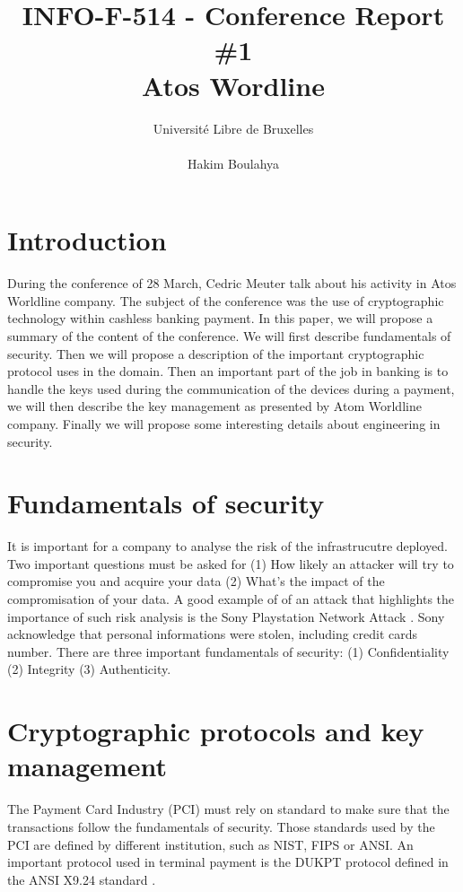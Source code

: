 \documentclass[10pt,a4paper]{article}
\title{INFO-F-514 - Conference Report \#1 \\
Atos Wordline}
\author{Université Libre de Bruxelles \\
\\ Hakim Boulahya}
\begin{document}
\maketitle

\newpage

\section{Introduction}

During the conference of 28 March, Cedric Meuter
talk about his activity in Atos Worldline company.
The subject of the conference was the use of
cryptographic technology within cashless banking payment.
In this paper, we will propose a summary of the content of the
conference. We will first describe fundamentals of security.
Then we will propose a description of the important
cryptographic protocol uses in the domain. Then an important
part of the job in banking is to handle the keys used
during the communication of the devices during a payment,
we will then describe the key management as presented
by Atom Worldline company.
Finally we will propose some interesting details about
engineering in security.


\section{Fundamentals of security}

It is important for a company to analyse the risk
of the infrastrucutre deployed. Two important questions must
be asked for (1) How likely an attacker will try to compromise
you and acquire your data (2) What's the impact of the compromisation
of your data. A good example of of an attack that highlights
the importance of such risk analysis is the Sony Playstation Network
Attack \cite{raiu_cyber-threat_2012}. Sony acknowledge that
personal informations were stolen, including credit cards number.
There are three important fundamentals of security:
(1) Confidentiality (2) Integrity (3) Authenticity.

\section{Cryptographic protocols and key management}

The Payment Card Industry (PCI) must rely on standard to make
sure that the transactions follow the fundamentals of security.
Those standards used by the PCI are defined by different institution, such
as NIST, FIPS or ANSI. An important protocol used in terminal payment
is the DUKPT protocol defined in
the ANSI X9.24 standard \cite{ansi_x924}.
\end{document}
